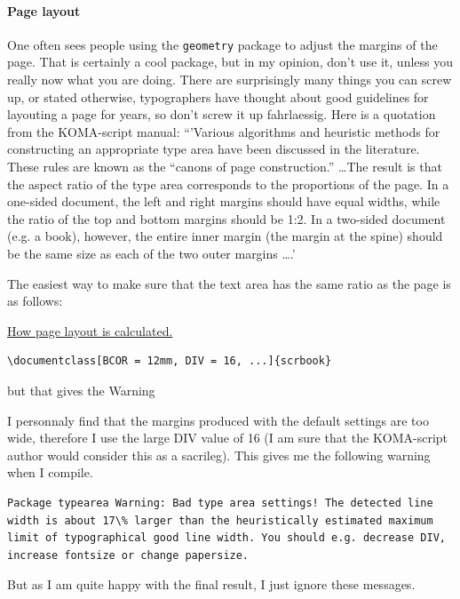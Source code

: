 \paragraph{Page layout} One often sees people using the \verb|geometry| package to adjust the margins of the page. That is certainly a cool package, but in my opinion, don't use it, unless you really now what you are doing. There are surprisingly many things you can screw up, or stated otherwise, typographers have thought about good guidelines for layouting a page for years, so don't screw it up fahrlaessig.  
Here is a quotation from the KOMA-script manual:
``'Various algorithms and heuristic methods for constructing an appropriate type area have been
discussed in the literature. These rules are known as the ``canons of page construction.'' \ldots The result is that the
aspect ratio of the type area corresponds to the proportions of the page. In a one-sided document,
the left and right margins should have equal widths, while the ratio of the top and bottom margins
should be 1:2. In a two-sided document (e.g. a book), however, the entire inner margin (the margin at the spine) should be the same size as each of the two outer margins \ldots.'

The easiest way to make sure that the text area has the same ratio as the page is as follows:

\href{https://markov.htwsaar.de/tex-archive/macros/latex/contrib/koma-script/doc/scrguide-en.pdf}{How page layout is calculated.}

\begin{lstlisting}
\documentclass[BCOR = 12mm, DIV = 16, ...]{scrbook}
\end{lstlisting}


but that gives the Warning

I personnaly find that the margins produced with the default settings are too wide, therefore I use the large DIV value of 16 (I am sure that the KOMA-script author would consider this as a sacrileg). This gives me the following warning when I compile.

\begin{lstlisting}
Package typearea Warning: Bad type area settings! The detected line width is about 17\% larger than the heuristically estimated maximum limit of typographical good line width. You should e.g. decrease DIV, increase fontsize or change papersize.
\end{lstlisting}

But as I am quite happy with the final result, I just ignore these messages.

